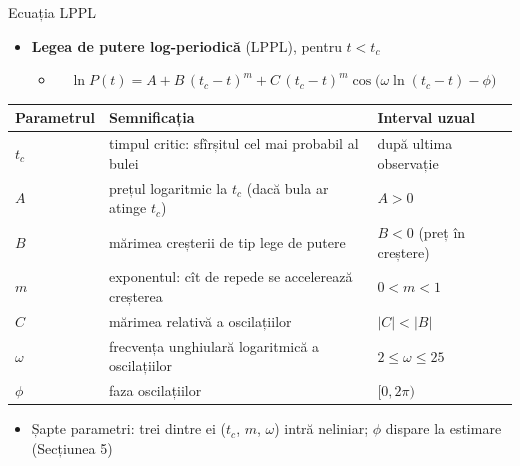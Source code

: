 \begin{frame}{Ecuația LPPL}
\itemsize{\footnotesize}
\begin{itemize}
    \item \textbf{Legea de putere log-periodică} (LPPL), pentru $t < t_c$
    \begin{itemize}
        \item $\quad \ln P(t) = A + B\,(t_c - t)^m + C\,(t_c - t)^m \cos\bigl(\omega \ln(t_c - t) - \phi\bigr)$
    \end{itemize}
\end{itemize}\begin{center}
\scriptsize
\begin{tabular}{lll}
\toprule
\textbf{Parametrul} & \textbf{Semnificația} & \textbf{Interval uzual} \\
\midrule
$t_c$ & timpul critic: sfîrșitul cel mai probabil al bulei & după ultima observație \\
$A$ & prețul logaritmic la $t_c$ (dacă bula ar atinge $t_c$) & $A > 0$ \\
$B$ & mărimea creșterii de tip lege de putere & $B < 0$ (preț în creștere) \\
$m$ & exponentul: cît de repede se accelerează creșterea & $0 < m < 1$ \\
$C$ & mărimea relativă a oscilațiilor & $|C| < |B|$ \\
$\omega$ & frecvența unghiulară logaritmică a oscilațiilor & $2 \le \omega \le 25$ \\
$\phi$ & faza oscilațiilor & $[0, 2\pi)$ \\
\bottomrule
\end{tabular}
\end{center}
\begin{itemize}
    \item Șapte parametri: trei dintre ei ($t_c$, $m$, $\omega$) intră neliniar; $\phi$ dispare la estimare (Secțiunea 5)
\end{itemize}
\end{frame}

